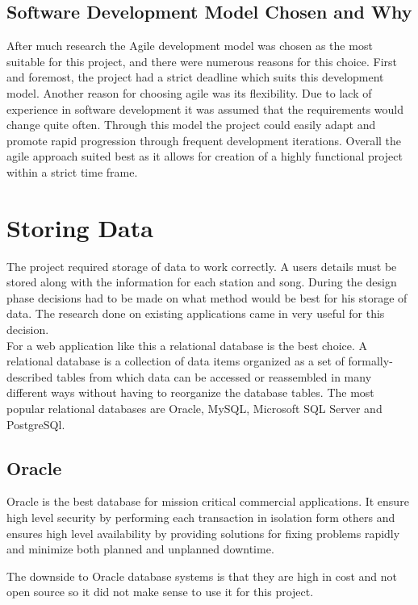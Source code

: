 \documentclass[a4paper, 12pt]{report}
\begin{document}
\subsection{Software Development Model Chosen and Why}
After much research the Agile development model was chosen as the most suitable for this project, and there were numerous reasons for this choice. First and foremost, the project had a strict deadline which suits this development model. Another reason for choosing agile was its flexibility. Due to lack of experience in software development it was assumed that the requirements would change quite often. Through this model the project could easily adapt and promote rapid progression through frequent development iterations. 
Overall the agile approach suited best as it allows for creation of a highly functional project within a strict time frame.  

\section{Storing Data}
The project required storage of data to work correctly. A users details must be stored along with the information for each station and song. During the design phase decisions had to be made on what method would be best for his storage of data. The research done on existing applications came in very useful for this decision. \\

For a web application like this a relational database is the best choice. A relational database is a collection of data items organized as a set of formally-described tables from which data can be accessed or reassembled in many different ways without having to reorganize the database tables\cite{RDSM}. The most popular relational databases are Oracle, MySQL, Microsoft SQL Server and PostgreSQl. 

\subsection{Oracle}
Oracle is the best database for mission critical commercial applications. It ensure high level security by performing each transaction in isolation form others and ensures high level availability by providing solutions for fixing problems rapidly and minimize both planned and unplanned downtime. 

The downside to Oracle database systems is that they are high in cost and not open source so it did not make sense to use it for this project\cite{oracle}.
\end{document}
